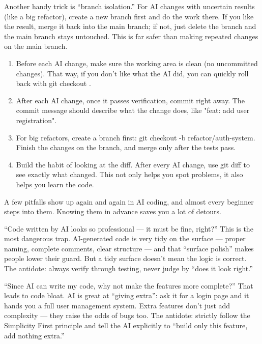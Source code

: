 Another handy trick is “branch isolation.” For AI changes with uncertain results (like a big refactor), create a new branch first and do the work there. If you like the result, merge it back into the main branch; if not, just delete the branch and the main branch stays untouched. This is far safer than making repeated changes on the main branch.

\begin{enumerate}
  \item Before each AI change, make sure the working area is clean (no uncommitted changes). That way, if you don't like what the AI did, you can quickly roll back with git checkout .
  \item After each AI change, once it passes verification, commit right away. The commit message should describe what the change does, like "feat: add user registration".
  \item For big refactors, create a branch first: git checkout -b refactor/auth-system. Finish the changes on the branch, and merge only after the tests pass.
  \item Build the habit of looking at the diff. After every AI change, use git diff to see exactly what changed. This not only helps you spot problems, it also helps you learn the code.
\end{enumerate}


A few pitfalls show up again and again in AI coding, and almost every beginner steps into them. Knowing them in advance saves you a lot of detours.


“Code written by AI looks so professional — it must be fine, right?” This is the most dangerous trap. AI-generated code is very tidy on the surface — proper naming, complete comments, clear structure — and that “surface polish” makes people lower their guard. But a tidy surface doesn't mean the logic is correct. The antidote: always verify through testing, never judge by “does it look right.”


“Since AI can write my code, why not make the features more complete?” That leads to code bloat. AI is great at “giving extra”: ask it for a login page and it hands you a full user management system. Extra features don't just add complexity — they raise the odds of bugs too. The antidote: strictly follow the Simplicity First principle and tell the AI explicitly to “build only this feature, add nothing extra.”

